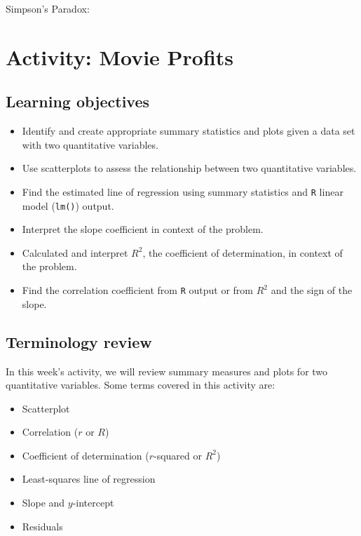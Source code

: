 \documentclass[
]{report}
\begin{document}
Simpson's Paradox:

\newpage

\hypertarget{activity-movie-profits}{%
\section{Activity: Movie Profits}\label{activity-movie-profits}}


\hypertarget{learning-objectives-1}{%
\subsection{Learning objectives}\label{learning-objectives-1}}

\begin{itemize}
\item
  Identify and create appropriate summary statistics and plots
  given a data set with two quantitative variables.
\item
  Use scatterplots to assess the relationship between two quantitative variables.
\item
  Find the estimated line of regression using summary statistics and \texttt{R} linear model (\texttt{lm()}) output.
\item
  Interpret the slope coefficient in context of the problem.
\item
  Calculated and interpret \(R^2\), the coefficient of determination, in context of the problem.
\item
  Find the correlation coefficient from \texttt{R} output or from \(R^2\) and the sign of the slope.
\end{itemize}

\hypertarget{terminology-review-4}{%
\subsection{Terminology review}\label{terminology-review-4}}

In this week's activity, we will review summary measures and plots for two quantitative variables. Some terms covered in this activity are:

\begin{itemize}
\item
  Scatterplot
\item
  Correlation (\(r\) or \(R\))
\item
  Coefficient of determination (\(r\)-squared or \(R^2\))
\item
  Least-squares line of regression
\item
  Slope and \(y\)-intercept
\item
  Residuals
\end{itemize}
\end{document}
